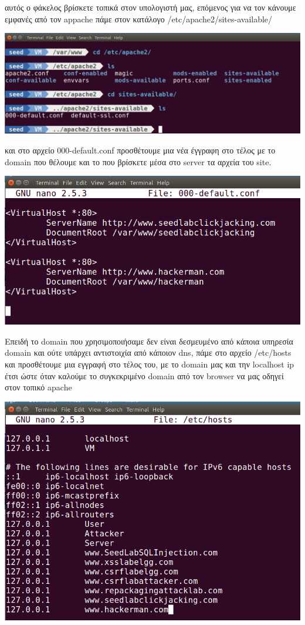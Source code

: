 \noindent
αυτός ο φάκελος βρίσκετε τοπικά στον υπολογιστή μας, επόμενος 
για να τον κάνουμε εμφανές από τον appache πάμε στον κατάλογο
/etc/apache2/sites-available/
\begin{center}
			\includegraphics[width=1\textwidth]{image/1.5.3.PNG}		
\end{center}
\noindent
και στο αρχείο 000-default.conf
προσθέτουμε μια νέα έγγραφη στο τέλος με το domain που θέλουμε και
το που βρίσκετε μέσα στο server τα αρχεία του site.
\begin{center}
			\includegraphics[width=1\textwidth]{image/1.5.4.PNG}		
\end{center}
\noindent
Επειδή το domain που χρησιμοποιήσαμε δεν είναι δεσμευμένο από κάποια 
υπηρεσία domain και ούτε υπάρχει αντιστοιχία από κάποιον dns, πάμε στο αρχείο
/etc/hosts και προσθέτουμε μια εγγραφή στο τέλος του, με το domain 
μας και την localhost ip έτσι ώστε όταν καλούμε το συγκεκριμένο 
domain από τον browser να μας οδηγεί στον τοπικό apache
\begin{center}
			\includegraphics[width=1\textwidth]{image/1.5.5.PNG}		
\end{center}

